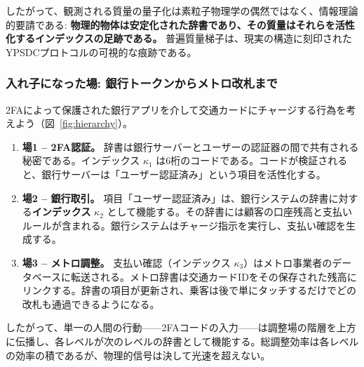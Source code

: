 \documentclass[12pt,a4paper]{article}
\theoremstyle{definition}
\theoremstyle{remark}
\begin{document}
	したがって、観測される質量の量子化は素粒子物理学の偶然ではなく、情報理論的要請である: \textbf{物理的物体は安定化された辞書であり、その質量はそれらを活性化するインデックスの足跡である。} 普遍質量梯子は、現実の構造に刻印されたYPSDCプロトコルの可視的な痕跡である。
	
	\subsubsection{入れ子になった場: 銀行トークンからメトロ改札まで}
	
	2FAによって保護された銀行アプリを介して交通カードにチャージする行為を考えよう（図~\ref{fig:hierarchy}）。
	
	\begin{enumerate}[leftmargin=*]
		\item \textbf{場1 -- 2FA認証。}
		辞書は銀行サーバーとユーザーの認証器の間で共有される秘密である。インデックス $\kappa_1$ は6桁のコードである。コードが検証されると、銀行サーバーは「ユーザー認証済み」という項目を活性化する。
		
		\item \textbf{場2 -- 銀行取引。}
		項目「ユーザー認証済み」は、銀行システムの辞書に対する\textbf{インデックス} $\kappa_2$ として機能する。その辞書には顧客の口座残高と支払いルールが含まれる。銀行システムはチャージ指示を実行し、支払い確認を生成する。
		
		\item \textbf{場3 -- メトロ調整。}
		支払い確認（インデックス $\kappa_3$）はメトロ事業者のデータベースに転送される。メトロ辞書は交通カードIDをその保存された残高にリンクする。辞書の項目が更新され、乗客は後で単にタッチするだけでどの改札も通過できるようになる。
	\end{enumerate}
	
	したがって、単一の人間の行動——2FAコードの入力——は調整場の階層を上方に伝播し、各レベルが次のレベルの辞書として機能する。総調整効率は各レベルの効率の積であるが、物理的信号は決して光速を超えない。
	
\end{document}
